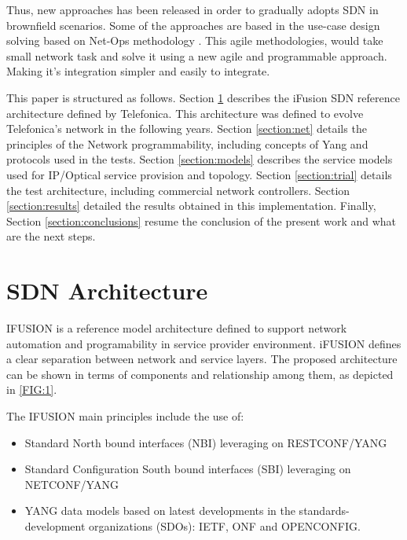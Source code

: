 \documentclass[a4paper,fleqn]{cas-dc}
\begin{document}
Thus, new approaches has been released in order to gradually adopts SDN in brownfield scenarios. Some of the approaches are based in the use-case design solving based on Net-Ops methodology \cite{devlic2012use,choi2018agile}. 
This agile methodologies, would take small network task and solve it using a new agile and programmable approach. Making it's integration simpler and easily to integrate.

This paper is structured as follows. Section \ref{section:arq} describes the iFusion SDN reference architecture defined by Telefonica. This architecture was defined to evolve Telefonica's network in the following years. Section \ref{section:net} details the principles of the Network programmability, including concepts of Yang and protocols used in the tests. Section \ref{section:models} describes the service models used for IP/Optical service provision and topology. Section \ref{section:trial} details the test architecture, including commercial network controllers. Section \ref{section:results} detailed the results obtained in this implementation. Finally, Section \ref{section:conclusions} resume the conclusion of the present work and what are the next steps.    

\section{SDN Architecture}
\label{section:arq}

\uppercase{iFUSION} is a reference model architecture defined to support network automation and programability in service provider environment. iFUSION defines a clear separation between network and service layers. The proposed architecture can be shown in terms of components and relationship among them, as depicted in \ref{FIG:1}. 

The \uppercase{iFUSION} main principles include the use of:
\begin{itemize}
    \item Standard North bound interfaces (NBI) leveraging on \uppercase{RESTconf/YANG}
    \item Standard Configuration South bound interfaces (SBI) leveraging on \uppercase{NETCONF/YANG}
    \item YANG data models based on latest developments in the standards-development organizations (SDOs): \uppercase{IETF}, \uppercase{ONF} and \uppercase{OpenConfig}.
\end{itemize}
\end{document}
